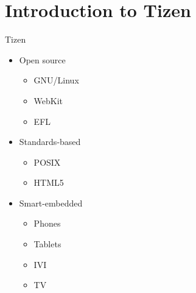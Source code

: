 \documentclass[presentation,aspectratio=43,12pt]{beamer}
\begin{document}
\section{Introduction to Tizen}
\label{sec-2}
\begin{frame}[label=sec-2-2]{Tizen}
\begin{itemize}
\item Open source
\begin{itemize}
\item GNU/Linux
\item WebKit
\item EFL
\end{itemize}
\item Standards-based
\begin{itemize}
\item POSIX
\item HTML5
\end{itemize}
\item Smart-embedded
\begin{itemize}
\item Phones
\item Tablets
\item IVI
\item TV
\end{itemize}
\end{itemize}

\end{frame}
\end{document}
